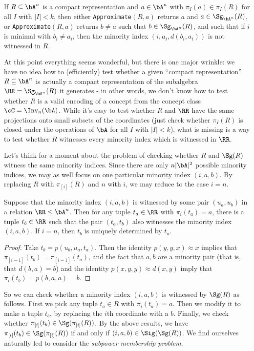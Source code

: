 \begin{prop} If $R \subseteq \bA^n$ is a compact representation and $a \in \bA^n$ with $\pi_I(a) \in \pi_I(R)$ for all $I$ with $|I| < k$, then either \texttt{Approximate}$(R,a)$ returns $a$ and $a \in \Sg_{\bA^n}(R)$, or \texttt{Approximate}$(R,a)$ returns $b \ne a$ such that $b \in \Sg_{\bA^n}(R)$, and such that if $i$ is minimal with $b_i \ne a_i$, then the minority index $(i,a_i,d(b_i,a_i))$ is not witnessed in $R$.
\end{prop}

At this point everything seems wonderful, but there is one major wrinkle: we have no idea how to (efficiently) test whether a given ``compact representation'' $R \subseteq \bA^n$ is actually a compact representation of the subalgebra $\RR = \Sg_{\bA^n}(R)$ it generates - in other words, we don't know how to test whether $R$ is a valid encoding of a concept from the concept class $\cC = \Inv_n(\bA)$. While it's easy to test whether $R$ and $\RR$ have the same projections onto small subsets of the coordinates (just check whether $\pi_I(R)$ is closed under the operations of $\bA$ for all $I$ with $|I| < k$), what is missing is a way to test whether $R$ witnesses every minority index which is witnessed in $\RR$.

Let's think for a moment about the problem of checking whether $R$ and $\Sg(R)$ witness the same minority indices. Since there are only $n|\bA|^2$ possible minority indices, we may as well focus on one particular minority index $(i,a,b)$. By replacing $R$ with $\pi_{[i]}(R)$ and $n$ with $i$, we may reduce to the case $i = n$.

\begin{prop} Suppose that the minority index $(i,a,b)$ is witnessed by some pair $(u_a,u_b)$ in a relation $\RR \le \bA^n$. Then for any tuple $t_a \in \RR$ with $\pi_i(t_a) = a$, there is a tuple $t_b \in \RR$ such that the pair $(t_a,t_b)$ also witnesses the minority index $(i,a,b)$. If $i = n$, then $t_b$ is uniquely determined by $t_a$.
\end{prop}
\begin{proof} Take $t_b = p(u_b,u_a,t_a)$. Then the identity $p(y,y,x)\approx x$ implies that $\pi_{[i-1]}(t_b) = \pi_{[i-1]}(t_a)$, and the fact that $a,b$ are a minority pair (that is, that $d(b,a) = b$) and the identity $p(x,y,y) \approx d(x,y)$ imply that $\pi_i(t_b) = p(b,a,a) = b$.
\end{proof}

So we can check whether a minority index $(i,a,b)$ is witnessed by $\Sg(R)$ as follows. First we pick any tuple $t_a \in R$ with $\pi_i(t_a) = a$. Then we modify it to make a tuple $t_b$, by replacing the $i$th coordinate with a $b$. Finally, we check whether $\pi_{[i]}(t_b) \in \Sg(\pi_{[i]}(R))$. By the above results, we have $\pi_{[i]}(t_b) \in \Sg(\pi_{[i]}(R))$ if and only if $(i,a,b) \in \Sig(\Sg(R))$. We find ourselves naturally led to consider the \emph{subpower membership problem}.

